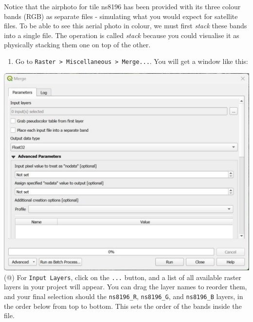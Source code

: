 \documentclass[
  letterpaper,
  DIV=11,
  numbers=noendperiod]{scrreprt}
\providecommand{\tightlist}{%
  \setlength{\itemsep}{0pt}\setlength{\parskip}{0pt}}\usepackage{longtable,booktabs,array}
\begin{document}
Notice that the airphoto for tile ns8196 has been provided with its
three colour bands (RGB) as separate files - simulating what you would
expect for satellite files. To be able to see this aerial photo in
colour, we must first \emph{stack} these bands into a single file. The
operation is called \emph{stack} because you could visualise it as
physically stacking them one on top of the other.

\begin{enumerate}
\def\labelenumi{(\arabic{enumi})}
\setcounter{enumi}{177}
\tightlist
\item
  Go to
  \texttt{Raster\ \textgreater{}\ Miscellaneous\ \textgreater{}\ Merge...}.
  You will get a window like this:
\end{enumerate}

\includegraphics{images/lab_6/lab_6_fig6_merge.jpg} (@) For
\texttt{Input\ Layers}, click on the \texttt{...} button, and a list of
all available raster layers in your project will appear. You can drag
the layer names to reorder them, and your final selection should the
\texttt{ns8196\_R}, \texttt{ns8196\_G}, and \texttt{ns8196\_B} layers,
in the order below from top to bottom. This sets the order of the bands
inside the file.
\end{document}
